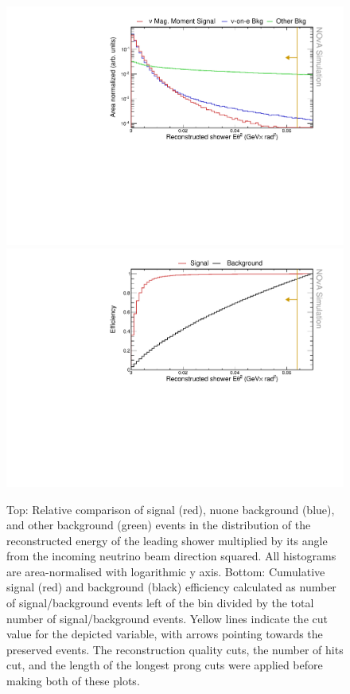 \begin{figure}[hbtp]
\centering
\includegraphics[width=.9\textwidth]{Plots/NuMMEventSelection/LogY_N1Cut_eth2Loose.pdf}
\includegraphics[width=.9\textwidth]{Plots/NuMMEventSelection/NuMM_N1Cut_eth2Looseleft_Eff.pdf}
\caption[$E\theta^2$ cut for pre-selection]{Top: Relative comparison of signal (red), \acrshort{nuone} background (blue), and other background (green) events in the distribution of the reconstructed energy of the leading shower multiplied by its angle from the incoming neutrino beam direction squared. All histograms are area-normalised with logarithmic y axis. Bottom: Cumulative signal (red) and background (black) efficiency calculated as number of signal/background events left of the bin divided by the total number of signal/background events. Yellow lines indicate the cut value for the depicted variable, with arrows pointing towards the preserved events. The reconstruction quality cuts, the number of hits cut, and the length of the longest prong cuts were applied before making both of these plots.}
\label{fig:NuMMCutsETh2Loose}
\end{figure}

